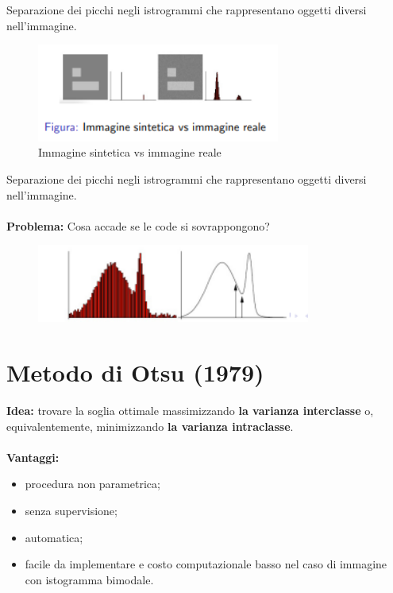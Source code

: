 Separazione dei picchi negli istrogrammi che rappresentano oggetti diversi nell'immagine.

\begin{figure}[H]
    \centering
    \includegraphics[width=8cm, keepaspectratio]{capitoli/immagini/imgs/trash-automatico-basilare.png}
    \caption*{Immagine sintetica vs immagine reale}
\end{figure}

Separazione dei picchi negli istrogrammi che rappresentano oggetti diversi nell'immagine.
\\\\
\textbf{Problema:} Cosa accade se le code si sovrappongono?

\begin{figure}[H]
    \centering
    \includegraphics[width=9cm, keepaspectratio]{capitoli/immagini/imgs/trash-automatico-basilare2.png}
\end{figure}

\section{Metodo di Otsu (1979)}

\textbf{Idea:} trovare la soglia ottimale massimizzando \textbf{la varianza interclasse} o,
equivalentemente, minimizzando \textbf{la varianza intraclasse}.
\\\\\textbf{Vantaggi:}

\begin{itemize}
    \item procedura non parametrica;
    \item senza supervisione;
    \item automatica;
    \item facile da implementare e costo computazionale basso nel caso di immagine con istogramma bimodale.
\end{itemize}

